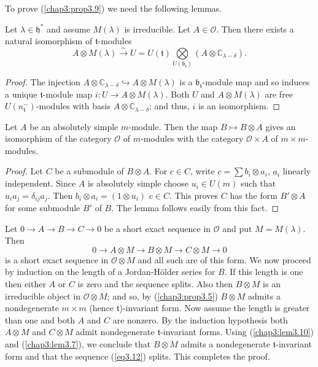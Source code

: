 To prove (\ref{chap3:prop3.9}) we need the following lemmas.


\begin{lemma}\label{chap3:lem3.10}%
Let $\lambda \in \mathfrak{h}^*$ and assume $M(\lambda)$ is
irreducible. Let $A \in \mathscr{O}$. Then there exists a natural
isomorphism of $\mathfrak{t}$-modules
$$
A \otimes M(\lambda) \xrightarrow{\sim} U = U (\mathfrak{t}) 
\bigotimes\limits_{U(\mathfrak{b}_\mathfrak{t})} (A \otimes
\mathbb{C}_{\lambda -\delta}).  
$$
\end{lemma}


\begin{proof}
The injection $A \otimes \mathbb{C}_{\lambda - \delta} \hookrightarrow
 A \otimes M(\lambda)$ is a $\mathfrak{b}_\mathfrak{t}$-module map and
 so induces a unique $\mathfrak{t}$-module map $i: U \to A \otimes
 M(\lambda)$. Both $U$ and $A \otimes M(\lambda)$ are free
 $U(n^-_\mathfrak{t})$-modules with basis $A \otimes
 \mathbb{C}_{\lambda-\delta}$; and thus, $i$ is an isomorphism.
\end{proof}

\begin{lemma}\label{chap3:lem3.11}%
Let $A$ be an absolutely simple $m$-module. Then the map $B\mapsto B
\otimes A$ gives an isomorphism of the category $\mathscr{O}$ of
$m$-modules with the category $\mathscr{O} \times A$ of $m \times
m$-modules.
\end{lemma}

\begin{proof}
Let $C$ be a submodule of $B \otimes A$. For $c \in C$, write $c =
\sum b_i \otimes a_i$, $a_i$ linearly independent. Since $A$ is
absolutely simple choose $u_i \in U(m)$ such that $u_i a_j =
\delta_{ij} a_j$. Then $b_i \otimes a_i = (1\otimes u_i)$ $c\in
C$. This proves $C$ has the form $B'\otimes A$ for some submodule $B'$
of $B$. The lemma follows easily from this fact.
\end{proof}

\medskip
{}
Let $0 \to A \to B \to C \to 0$ be a short exact sequence in
$\mathscr{O}$ and put $M= M(\lambda)$. Then
\begin{equation*}
0 \to A \otimes M \to B \otimes M \to C \otimes M \to 0 \tag{3.12}\label{eq3.12}
\end{equation*}\pageoriginale
is a short exact sequence in $\mathscr{O} \otimes M$ and all such are
of this form. We now proceed by induction on the length of a
Jordan-H\"older series for $B$. If this length is one then either $A$
or $C$ is zero and the sequence splits. Also then $B \otimes M$ is an
irreducible object in $\mathscr{O} \otimes M$; and so, by (\ref{chap3:prop3.5}) $B
\otimes M$ admits a nondegenerate $m\times m$ (hence
$\mathfrak{t}$)-invariant form. Now assume the length is greater than
one and both $A$ and $C$ are nonzero. By the induction hypothesis both
$A \otimes M$ and $C \otimes M$ admit nondegenerate
$\mathfrak{t}$-invariant forms. Using (\ref{chap3:lem3.10}) and
(\ref{chap3:lem3.7}), we conclude 
that $B\otimes M$ admits a nondegenerate $\mathfrak{t}$-invariant form
and that the sequence (\ref{eq3.12}) splits. This completes the proof.


